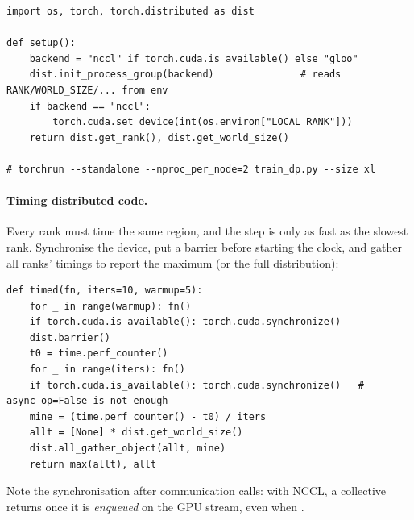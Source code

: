 \begin{lstlisting}[caption={One entry point for gloo-on-CPU and NCCL-on-GPU runs.},label={lst:proj2:launch}]
import os, torch, torch.distributed as dist

def setup():
    backend = "nccl" if torch.cuda.is_available() else "gloo"
    dist.init_process_group(backend)               # reads RANK/WORLD_SIZE/... from env
    if backend == "nccl":
        torch.cuda.set_device(int(os.environ["LOCAL_RANK"]))
    return dist.get_rank(), dist.get_world_size()

# torchrun --standalone --nproc_per_node=2 train_dp.py --size xl
\end{lstlisting}

\paragraph{Timing distributed code.} Every rank must time the same region, and the step is only as
fast as the slowest rank. Synchronise the device, put a barrier before starting the clock, and
gather all ranks' timings to report the maximum (or the full distribution):

\begin{lstlisting}[caption={Per-rank timing aggregated across ranks.},label={lst:proj2:disttime}]
def timed(fn, iters=10, warmup=5):
    for _ in range(warmup): fn()
    if torch.cuda.is_available(): torch.cuda.synchronize()
    dist.barrier()
    t0 = time.perf_counter()
    for _ in range(iters): fn()
    if torch.cuda.is_available(): torch.cuda.synchronize()   # async_op=False is not enough
    mine = (time.perf_counter() - t0) / iters
    allt = [None] * dist.get_world_size()
    dist.all_gather_object(allt, mine)
    return max(allt), allt
\end{lstlisting}

Note the synchronisation after communication calls: with NCCL, a collective returns once it is
\emph{enqueued} on the GPU stream, even when .

